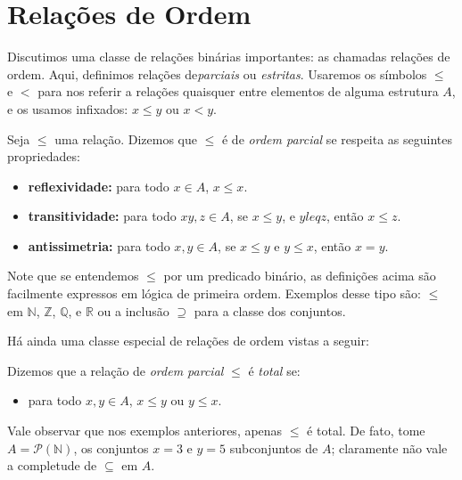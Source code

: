 \section{Relações de Ordem}
Discutimos uma classe de relações binárias importantes: as chamadas relações de ordem.
Aqui, definimos relações de\textit{parciais} ou \textit{estritas}.
Usaremos os símbolos $\leq$ e $<$ para nos referir a relações quaisquer entre elementos de alguma estrutura $A$, e os usamos infixados: $x \leq y$ ou $x < y$.

\begin{definition}
    \label{partial_order}
    Seja $\leq$ uma relação. Dizemos que $\leq$ é de \textit{ordem parcial} se respeita as seguintes propriedades:

    \begin{itemize}
        \item \textbf{reflexividade:} para todo $x \in A$, $x\leq x$.
        \item \textbf{transitividade:} para todo $xy,z \in A$, se $x\leq y$, e $yleq z$, então $x\leq z$.
        \item \textbf{antissimetria:} para todo $x,y \in A$, se $x\leq y$ e $y \leq x$, então $x=y$.
    \end{itemize}
\end{definition}

\noindent Note que se entendemos $\leq$ por um predicado binário, as definições acima são facilmente expressos em lógica de primeira ordem.
Exemplos desse tipo são: $\leq$ em $\mathbb{N}$, $\mathbb{Z}$, $\mathbb{Q}$, e $\mathbb{R}$ ou a inclusão $\supseteq$ para a classe dos conjuntos.

Há ainda uma classe especial de relações de ordem vistas a seguir:

\begin{definition}
    \label{partial_order_total}
    Dizemos que a relação de \textit{ordem parcial} $\leq$ é \textit{total} se:

    \begin{itemize}
        \item para todo $x, y \in A$, $x\leq y$ ou $y\leq x$.
    \end{itemize}
\end{definition}

\noindent Vale observar que nos exemplos anteriores, apenas $\leq$ é total.
De fato, tome $A = \mathcal{P}(\mathbb{N}) $, os conjuntos $x={3}$ e $y={5}$ subconjuntos de $A$; claramente não vale a completude de $\subseteq$ em $A$. %

